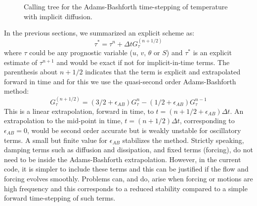 \begin{figure}
\begin{center}  \end{center}
\caption{
Calling tree for the Adams-Bashforth time-stepping of temperature with
implicit diffusion.}
\label{fig:call-tree-adams-bashforth}
\end{figure}

In the previous sections, we summarized an explicit scheme as:
\begin{equation}
\tau^{*} = \tau^{n} + \Delta t G_\tau^{(n+1/2)}
\label{eq:taustar}
\end{equation}
where $\tau$ could be any prognostic variable ($u$, $v$, $\theta$ or
$S$) and $\tau^*$ is an explicit estimate of $\tau^{n+1}$ and would be
exact if not for implicit-in-time terms. The parenthesis about $n+1/2$
indicates that the term is explicit and extrapolated forward in time
and for this we use the quasi-second order Adams-Bashforth method:
\begin{equation}
G_\tau^{(n+1/2)} = ( 3/2 + \epsilon_{AB}) G_\tau^n
- ( 1/2 + \epsilon_{AB}) G_\tau^{n-1}
\label{eq:adams-bashforth2}
\end{equation}
This is a linear extrapolation, forward in time, to
$t=(n+1/2+{\epsilon_{AB}})\Delta t$. An extrapolation to the mid-point
in time, $t=(n+1/2)\Delta t$, corresponding to $\epsilon_{AB}=0$,
would be second order accurate but is weakly unstable for oscillatory
terms. A small but finite value for $\epsilon_{AB}$ stabilizes the
method. Strictly speaking, damping terms such as diffusion and
dissipation, and fixed terms (forcing), do not need to be inside the
Adams-Bashforth extrapolation. However, in the current code, it is
simpler to include these terms and this can be justified if the flow
and forcing evolves smoothly. Problems can, and do, arise when forcing
or motions are high frequency and this corresponds to a reduced
stability compared to a simple forward time-stepping of such terms.

